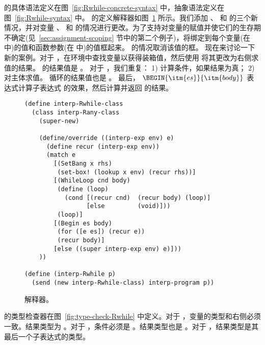 \documentclass[11pt]{book}
\begin{document}
 \LangLoop{} 的具体语法定义在图~\ref{fig:Rwhile-concrete-syntax} 中，抽象语法定义在图~\ref{fig:Rwhile-syntax} 中。
%
 \LangLoop{} 的定义解释器如图~\ref{fig:interp-Rwhile} 所示。我们添加  、
 和  的三个新情况，并对变量  、  和  的情况进行更改。为了支持对变量的赋值并使它们的生存期不确定(见~\ref{sec:assignment-scoping} 节中的第二个例子)，将绑定到每个变量(在  中)的值和函数参数(在  中)的值框起来。  的情况取消该值的框。
%
现在来讨论一下新的案例。对于  ，在环境中查找变量以获得装箱值，然后使用  将其更改为右侧求值的结果。  的结果值是  。
%
对于  ，我们重复： 1) 计算条件，如果结果为真； 2) 对主体求值。
  循环的结果值也是  。
%
最后， $\BEGIN{\itm{es}}{\itm{body}}$ 表达式计算子表达式  的效果，然后计算并返回  的结果。


\begin{figure}[tbp]
\begin{lstlisting}[basicstyle=\ttfamily\footnotesize]
(define interp-Rwhile-class
  (class interp-Rany-class
    (super-new)

    (define/override ((interp-exp env) e)
      (define recur (interp-exp env))
      (match e
        [(SetBang x rhs)
         (set-box! (lookup x env) (recur rhs))]
        [(WhileLoop cnd body)
         (define (loop)
           (cond [(recur cnd)  (recur body) (loop)]
                 [else         (void)]))
         (loop)]
        [(Begin es body)
         (for ([e es]) (recur e))
         (recur body)]
        [else ((super interp-exp env) e)]))
    ))

(define (interp-Rwhile p)
  (send (new interp-Rwhile-class) interp-program p))
\end{lstlisting}
\caption{ \LangLoop{} 解释器。}
\label{fig:interp-Rwhile}
\end{figure}

 \LangLoop{} 的类型检查器在图~\ref{fig:type-check-Rwhile} 中定义。对于  ，变量的类型和右侧必须一致。结果类型为
 。对于  ，条件必须是
 。结果类型也是  。对于
 ，结果类型是其最后一个子表达式的类型。
\end{document}
